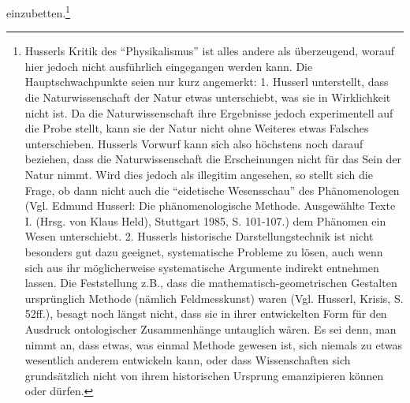 einzubetten.\footnote{Husserls Kritik des "`Physikalismus"' ist alles andere
  als überzeugend, worauf hier jedoch nicht ausführlich eingegangen werden
  kann.  Die Hauptschwachpunkte seien nur kurz angemerkt: 1. Husserl
  unterstellt, dass die Naturwissenschaft der Natur etwas unterschiebt, was sie
  in Wirklichkeit nicht ist. Da die Naturwissenschaft ihre Ergebnisse jedoch
  experimentell auf die Probe stellt, kann sie der Natur nicht ohne Weiteres
  etwas Falsches unterschieben. Husserls Vorwurf kann sich also höchstens noch
  darauf beziehen, dass die Naturwissenschaft die Erscheinungen nicht für das
  Sein der Natur nimmt. Wird dies jedoch als illegitim angesehen, so stellt
  sich die Frage, ob dann nicht auch die "`eidetische Wesensschau"' des
  Phänomenologen (Vgl.  Edmund Husserl: Die phänomenologische Methode.
  Ausgewählte Texte I. (Hrsg.  von Klaus Held), Stuttgart 1985, S. 101-107.)
  dem Phänomen ein Wesen unterschiebt.  2. Husserls historische
  Darstellungstechnik ist nicht besonders gut dazu geeignet, systematische
  Probleme zu lösen, auch wenn sich aus ihr möglicherweise systematische
  Argumente indirekt entnehmen lassen. Die Feststellung z.B., dass die
  mathematisch-geometrischen Gestalten ursprünglich Methode (nämlich
  Feldmesskunst) waren (Vgl. Husserl, Krisis, S. 52ff.), besagt noch längst
  nicht, dass sie in ihrer entwickelten Form für den Ausdruck ontologischer
  Zusammenhänge untauglich wären. Es sei denn, man nimmt an, dass etwas, was
  einmal Methode gewesen ist, sich niemals zu etwas wesentlich anderem
  entwickeln kann, oder dass Wissenschaften sich grundsätzlich nicht von ihrem
  historischen Ursprung emanzipieren können oder dürfen.}


